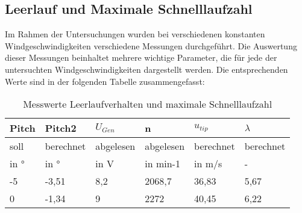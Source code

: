 \subsection{Leerlauf und Maximale Schnelllaufzahl}
Im Rahmen der Untersuchungen wurden bei verschiedenen konstanten Windgeschwindigkeiten verschiedene Messungen durchgeführt.
 Die Auswertung dieser Messungen beinhaltet mehrere wichtige Parameter, die für jede der untersuchten Windgeschwindigkeiten dargestellt werden. Die entsprechenden Werte sind in der folgenden Tabelle zusammengefasst:

\begin{table}[H]
    \centering
    \caption{Messwerte Leerlaufverhalten und maximale Schnelllaufzahl}
    \label{tab_Messwerte_Leerlaufverhalten}
    \begin{tabular}{|l|l|l|l|l|l|}
    \hline
    \rowcolor[HTML]{70AD47} 
    {\color[HTML]{FFFFFF} \textbf{Pitch}} & {\color[HTML]{FFFFFF} \textbf{Pitch2}} & {\color[HTML]{FFFFFF} \textbf{$U_{Gen}$}} & {\color[HTML]{FFFFFF} \textbf{n}} & {\color[HTML]{FFFFFF} \textbf{$u_{tip}$}} & {\color[HTML]{FFFFFF} \textbf{$\lambda$}} \\ \hline
    \rowcolor[HTML]{70AD47} 
    soll                                  & berechnet                              & abgelesen                                          & abgelesen                                & berechnet                                            & berechnet                                      \\ \hline
    \rowcolor[HTML]{70AD47} 
    in °                                  & in °                                   & in V                                               & in min-1                                 & in m/s                                               & -                                              \\ \hline
    \rowcolor[HTML]{C6E0B4} 
    -5                                    & -3,51                                  & 8,2                                                & 2068,7                                   & 36,83                                          & 5,67                                    \\ \hline
    \rowcolor[HTML]{E2EFDA} 
    0                                     & -1,34                                  & 9                                                  & 2272                                     & 40,45                                          & 6,22                                    \\ \hline

\end{tabular}
\end{table}
